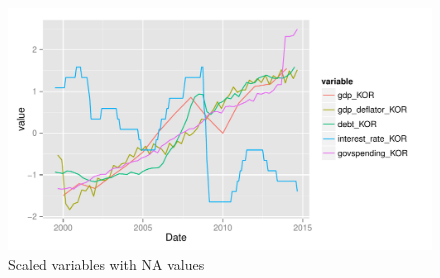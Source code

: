 \documentclass[12pt]{article}
\begin{document}
\begin{figure}
  \centering
    \includegraphics{na_plot_KOR.pdf}
  \caption{Scaled variables with NA values}
  \label{fig:na_plot_KOR}
\end{figure}
\end{document}
